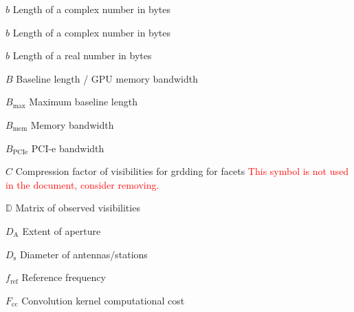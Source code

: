\documentclass[11pt,a4paper]{article}
\newcommand{\bytes}{b} %
\newcommand{\cbytes}{b} %
\newcommand{\rbytes}{b} %
\newcommand{\bl}{B} %
\newcommand{\maxbl}{B_{\mathrm{max}}} %
\newcommand{\membw}{B_\mathrm{mem}} %
\newcommand{\pciebw}{B_\mathrm{PCIe}} %
\newcommand{\viscompr}{C} %
\newcommand{\vism}{\mathbb{D}} %
\newcommand{\da}{D_{\mathrm A}} %
\newcommand{\ds}{D_{\mathrm s}} %
\newcommand{\reff}{f_\mathrm{ref}} %
\newcommand{\fcc}{F_{\mathrm{cc}}} %
\begin{document}
\newcommand{\wnt}{{w_{\nu}^t}}
\newcommand{\wnq}{{w_{\nu}^q}}
\newcommand{\wntq}{{w_{\nu}^{t+q}}}
\newcommand{\Wntn}{{\tens{w^{mfs}_{t,\nu}}}}
\newcommand{\Wntnd}{{\tens{{w^{mfs}_{t,\nu}}^\dag}}}
\newcommand{\Wnpn}{{\tens{W^{mfs}_{p,\nu}}}}
\newcommand{\Wnpnd}{{\tens{{W^{mfs}_{p,\nu}}^\dag}}}

\newcommand{\pd}{{\partial}}
\newcommand{\mi}{{m_{I}}}
\newcommand{\R}{{R}}
\newcommand{\Rd}{{R^\dag}}
\newcommand{\I}{{\vec{I}}}


\clearpage \sdplistofsymbols
\begin{basedescript}{\desclabelstyle{\pushlabel}\desclabelwidth{6em}}
\item[$\bytes$] Length of a complex number in bytes \vspace{-0.2cm}
\item[$\cbytes$] Length of a complex number in bytes \vspace{-0.2cm}
\item[$\rbytes$] Length of a real number in bytes \vspace{-0.2cm}
\item[$\bl$] Baseline length / GPU memory bandwidth \vspace{-0.2cm}
\item[$\maxbl$] Maximum baseline length \vspace{-0.2cm}
\item[$\membw$] Memory bandwidth \vspace{-0.2cm}
\item [$\pciebw$] PCI-e bandwidth \vspace{-0.2cm}
\item[$\viscompr$] Compression factor of visibilities for grdding for facets
  \textcolor{red}{This symbol is not used in the document, consider removing.}
  \vspace{-0.2cm}
\item[$\vism$] Matrix of observed visibilities \vspace{-0.2cm}
\item[$\da$] Extent of aperture \vspace{-0.2cm}
\item[$\ds$] Diameter of antennas/stations \vspace{-0.2cm}
\item[$\reff$] Reference frequency\vspace{-0.2cm}
\item[$\fcc$] Convolution kernel computational cost\vspace{-0.2cm}

\end{basedescript}
\end{document}
